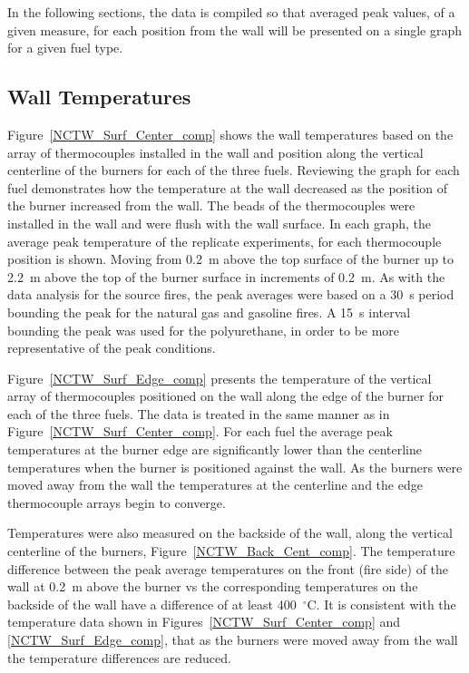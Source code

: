 \documentclass[twoside]{uocthesis}
\begin{document}
{In the following sections, the data is compiled so that averaged peak values, of a given measure, for each position from the wall will be presented on a single graph for a given fuel type.

\subsection{Wall Temperatures}

Figure~\ref{NCTW_Surf_Center_comp} shows the wall temperatures based on the array of thermocouples installed in the wall and position along the vertical centerline of the burners for each of the three fuels. Reviewing the graph for each fuel demonstrates how the temperature at the wall decreased as the position of the burner increased from the wall. The beads of the thermocouples were installed in the wall and were flush with the wall surface. In each graph, the average peak temperature of the replicate experiments, for each thermocouple position is shown. Moving from 0.2~m above the top surface of the burner up to 2.2~m above the top of the burner surface in increments of 0.2~m. As with the data analysis for the source fires, the peak averages were based on a 30~s period bounding the peak for the natural gas and gasoline fires.  A 15~s interval bounding the peak was used for the polyurethane, in order to be more representative of the peak conditions.

Figure~\ref{NCTW_Surf_Edge_comp} presents the temperature of the vertical array of thermocouples positioned on the wall along the edge of the burner for each of the three fuels.  The data is treated in the same manner as in Figure~\ref{NCTW_Surf_Center_comp}.  For each fuel the average peak temperatures at the burner edge are significantly lower than the centerline temperatures when the burner is positioned against the wall.  As the burners were moved away from the wall the temperatures at the centerline and the edge thermocouple arrays begin to converge.

Temperatures were also measured on the backside of the wall, along the vertical centerline of the burners, Figure~\ref{NCTW_Back_Cent_comp}. The temperature difference between the peak average temperatures on the front (fire side) of the wall at 0.2~m above the burner vs the corresponding temperatures on the backside of the wall have a difference of at least 400~$^\circ$C.  It is consistent with the temperature data shown in Figures~\ref{NCTW_Surf_Center_comp} and \ref{NCTW_Surf_Edge_comp}, that as the burners were moved away from the wall the temperature differences are reduced.

}
\end{document}
